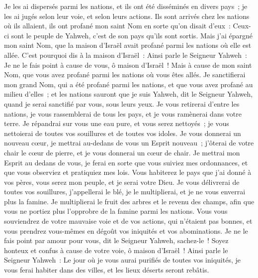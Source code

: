 \begin{multicols}{2}
Je les ai dispersés parmi les nations, et ils ont été disséminés en divers pays~; je les ai jugés selon leur voie, et selon leurs actions.
Ils sont arrivés chez les nations où ils allaient, ils ont profané mon saint Nom en sorte qu'on disait d'eux~: Ceux-ci sont le peuple de Yahweh, c'est de son pays qu'ils sont sortis.
Mais j'ai épargné mon saint Nom, que la maison d'Israël avait profané parmi les nations où elle est allée.
C'est pourquoi dis à la maison d'Israël~: Ainsi parle le Seigneur Yahweh~: Je ne le fais point à cause de vous, ô maison d'Israël~! Mais à cause de mon saint Nom, que vous avez profané parmi les nations où vous êtes allés.
Je sanctifierai mon grand Nom, qui a été profané parmi les nations, et que vous avez profané au milieu d'elles~; et les nations sauront que je suis Yahweh, dit le Seigneur Yahweh, quand je serai sanctifié par vous, sous leurs yeux.
Je vous retirerai d'entre les nations, je vous rassemblerai de tous les pays, et je vous ramènerai dans votre terre.
Je répandrai sur vous une eau pure, et vous serez nettoyés~; je vous nettoierai de toutes vos souillures et de toutes vos idoles.
Je vous donnerai un nouveau cœur, je mettrai au-dedans de vous un Esprit nouveau~; j'ôterai de votre chair le cœur de pierre, et je vous donnerai un cœur de chair.
Je mettrai mon Esprit au dedans de vous, je ferai en sorte que vous suiviez mes ordonnances, et que vous observiez et pratiquiez mes lois.
Vous habiterez le pays que j'ai donné à vos pères, vous serez mon peuple, et je serai votre Dieu.
Je vous délivrerai de toutes vos souillures, j'appellerai le blé, je le multiplierai, et je ne vous enverrai plus la famine.
Je multiplierai le fruit des arbres et le revenu des champs, afin que vous ne portiez plus l'opprobre de la famine parmi les nations.
Vous vous souviendrez de votre mauvaise voie et de vos actions, qui n'étaient pas bonnes, et vous prendrez vous-mêmes en dégoût vos iniquités et vos abominations.
Je ne le fais point par amour pour vous, dit le Seigneur Yahweh, sachez-le~! Soyez honteux et confus à cause de votre voie, ô maison d'Israël~!
Ainsi parle le Seigneur Yahweh~: Le jour où je vous aurai purifiés de toutes vos iniquités, je vous ferai habiter dans des villes, et les lieux déserts seront rebâtis.

\end{multicols}
